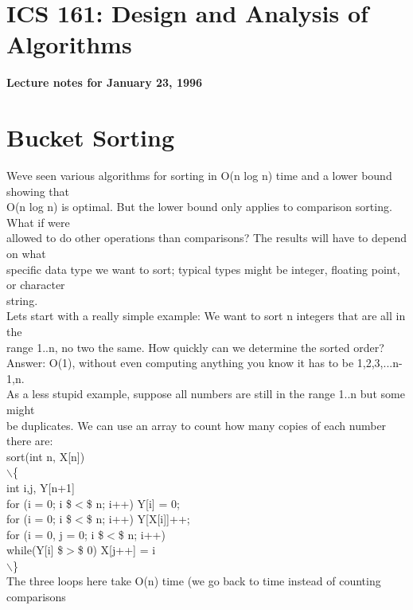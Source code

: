 \documentclass[a4paper,11pt]{article}
\begin{document}
\begin{flushleft}
{
\section{ICS 161: Design and Analysis of Algorithms}
\textbf{Lecture notes for January 23, 1996}
\vspace{1em}\\ \section{Bucket Sorting}
}
{
\raggedleft
Weve seen various algorithms for sorting in O(n log n) time and a lower bound showing that
\\ O(n log n) is optimal. But the lower bound only applies to comparison sorting. What if were
\\ allowed to do other operations than comparisons? The results will have to depend on what
\\ specific data type we want to sort; typical types might be integer, floating point, or character
\\ }
{
string.
\\ }
{
\raggedleft
Lets start with a really simple example: We want to sort n integers that are all in the
\\ }
{
range 1..n, no two the same. How quickly can we determine the sorted order?
\\ }
{
\raggedleft
Answer: O(1), without even computing anything you know it has to be 1,2,3,...n-
\\ }
{
1,\space n.
\\ }
{
\raggedleft
As a less stupid example, suppose all numbers are still in the range 1..n but some might
\\ }
{
be duplicates. We can use an array to count how many copies of each number there are:
\\ sort(int n, X[n])
\\ $\backslash$\{
\\ int i,j, Y[n+1]
\\ for (i = 0; i \$$<$\$ n; i++) Y[i] = 0;
\\ for (i = 0; i \$$<$\$ n; i++) Y[X[i]]++;
\\ for (i = 0, j = 0; i \$$<$\$ n; i++)
\\ while(Y[i] \$$>$\$ 0) X[j++] = i
\\ $\backslash$\}
\\ }
{
\raggedleft
The three loops here take O(n) time (we go back to time instead of counting comparisons
}
\end{flushleft}
\end{document}
